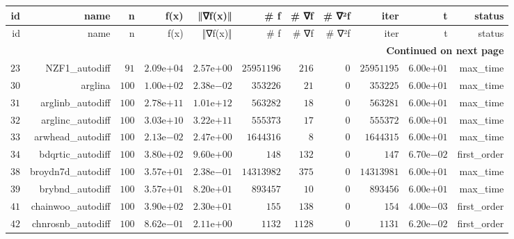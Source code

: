 \documentclass[varwidth=20cm,crop=true]{standalone}
\begin{document}
\begin{longtable}{rrrrrrrrrrr}
  \hline
  id & name & n & f(x) & ‖∇f(x)‖ & # f & # ∇f & # ∇²f & iter & t & status \\\hline
  \endfirsthead
  \hline
  id & name & n & f(x) & ‖∇f(x)‖ & # f & # ∇f & # ∇²f & iter & t & status \\\hline
  \endhead
  \hline
  \multicolumn{11}{r}{{\bfseries Continued on next page}}\\
  \hline
  \endfoot
  \endlastfoot
  \(    23\) & NZF1\_autodiff & \(    91\) & \( 2.09\)e\(+04\) & \( 2.57\)e\(+00\) & \(25951196\) & \(   216\) & \(     0\) & \(25951195\) & \( 6.00\)e\(+01\) & max\_time \\
  \(    30\) & arglina & \(   100\) & \( 1.00\)e\(+02\) & \( 2.38\)e\(-02\) & \(353226\) & \(    21\) & \(     0\) & \(353225\) & \( 6.00\)e\(+01\) & max\_time \\
  \(    31\) & arglinb\_autodiff & \(   100\) & \( 2.78\)e\(+11\) & \( 1.01\)e\(+12\) & \(563282\) & \(    18\) & \(     0\) & \(563281\) & \( 6.00\)e\(+01\) & max\_time \\
  \(    32\) & arglinc\_autodiff & \(   100\) & \( 3.03\)e\(+10\) & \( 3.22\)e\(+11\) & \(555373\) & \(    17\) & \(     0\) & \(555372\) & \( 6.00\)e\(+01\) & max\_time \\
  \(    33\) & arwhead\_autodiff & \(   100\) & \( 2.13\)e\(-02\) & \( 2.47\)e\(+00\) & \(1644316\) & \(     8\) & \(     0\) & \(1644315\) & \( 6.00\)e\(+01\) & max\_time \\
  \(    34\) & bdqrtic\_autodiff & \(   100\) & \( 3.80\)e\(+02\) & \( 9.60\)e\(+00\) & \(   148\) & \(   132\) & \(     0\) & \(   147\) & \( 6.70\)e\(-02\) & first\_order \\
  \(    38\) & broydn7d\_autodiff & \(   100\) & \( 3.57\)e\(+01\) & \( 2.38\)e\(-01\) & \(14313982\) & \(   375\) & \(     0\) & \(14313981\) & \( 6.00\)e\(+01\) & max\_time \\
  \(    39\) & brybnd\_autodiff & \(   100\) & \( 3.57\)e\(+01\) & \( 8.20\)e\(+01\) & \(893457\) & \(    10\) & \(     0\) & \(893456\) & \( 6.00\)e\(+01\) & max\_time \\
  \(    41\) & chainwoo\_autodiff & \(   100\) & \( 3.90\)e\(+02\) & \( 2.30\)e\(+01\) & \(   155\) & \(   138\) & \(     0\) & \(   154\) & \( 4.00\)e\(-03\) & first\_order \\
  \(    42\) & chnrosnb\_autodiff & \(   100\) & \( 8.62\)e\(-01\) & \( 2.11\)e\(+00\) & \(  1132\) & \(  1128\) & \(     0\) & \(  1131\) & \( 6.20\)e\(-02\) & first\_order \\

\end{longtable}
\end{document}
